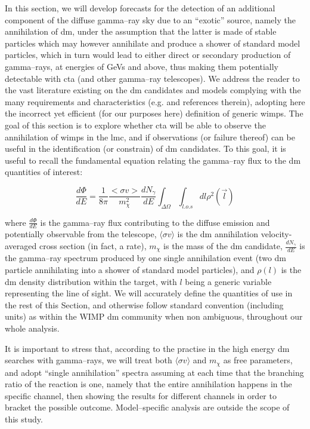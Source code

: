 \documentclass{article}
\newcommand{\sigv}{\langle \sigma v \rangle}
\newcommand{\mdm}{m_{\chi}}
\begin{document}
\par In this section, we will develop forecasts for the detection of an additional component of the diffuse gamma--ray sky due to an ``exotic''  source, namely the annihilation of \gls{dm}, under the assumption that the latter is made of stable particles which may however annihilate and produce a shower of standard model particles, which in turn would lead to either direct or secondary production of gamma--rays, at energies of GeVs and above, thus making them potentially detectable with \gls{cta} (and other gamma--ray telescopes).
We address the reader to the vast literature existing on the \gls{dm} candidates and models complying with the many requirements and characteristics (e.g. \cite{2010pdmo.book.....B, Boyarsky:2009ix, 2004NuPhB.683..219B, 2000PhRvL..85.1158H, Blais:2002nd} and references therein), adopting here the incorrect yet efficient (for our purposes here) definition of generic \glspl{wimp}.
The goal of this section is to explore whether \gls{cta} will be able to observe the annihilation of \glspl{wimp} in the \gls{lmc}, and if observations (or failure thereof) can be useful in the identification (or constrain) of \gls{dm} candidates. To this goal, it is useful to recall the fundamental equation relating the gamma--ray flux to the \gls{dm} quantities of interest:

\begin{equation}
    \frac{d \Phi}{dE}=\frac{1}{8 \pi} \frac{<\sigma v>}{m_{\chi}^2} \frac{d N_{\gamma}}{dE} \int_{\Delta\Omega}\int_{l.o.s} dl \rho^2(\vec{l})
\label{eq:dmflux}                                     
\end{equation}

 
where $\frac{d \Phi}{dE}$ is the gamma--ray flux contributing to the diffuse emission and potentially observable from the telescope, 
$\sigv$ is the \gls{dm} annihilation velocity-averaged cross section (in fact, a rate), $m_{\chi}$ is the mass of the \gls{dm} candidate, $\frac{dN_{\gamma}}{dE}$ is the gamma--ray spectrum produced by one single annihilation event (two \gls{dm} particle annihilating into a shower of  standard model particles), and $\rho(l)$ is the \gls{dm} density distribution within the target, with $l$ being a generic variable representing the line of sight.
We will accurately define the quantities of use in the rest of this Section, and otherwise follow standard convention (including units) as within the WIMP \gls{dm} community when non ambiguous, throughout our whole analysis.

It is important to stress that, according to the practise in the high energy \gls{dm} searches with gamma--rays, we will treat both $\sigv$ and $\mdm$ as free parameters, and adopt ``single annihilation'' spectra assuming at each time that the branching ratio of the reaction is one, namely that the entire annihilation happens in the specific channel, then showing the results for different channels in order to bracket the possible outcome. Model--specific analysis are outside the scope of this study.
\end{document}
